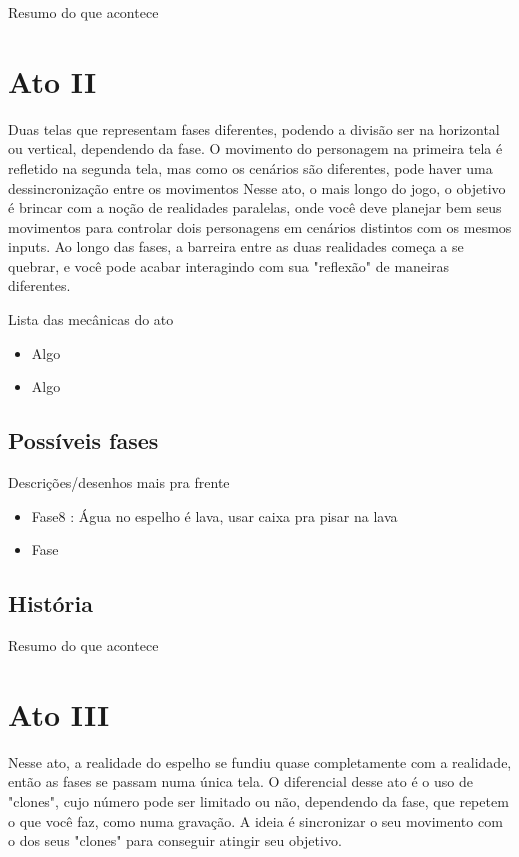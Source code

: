 \documentclass[a4paper, 11pt]{article}
\begin{document}
	Resumo do que acontece  
 
\section{Ato II} 
 
	Duas telas que representam fases diferentes, podendo a divisão ser na horizontal ou vertical, dependendo da fase. 
	O movimento do personagem na primeira tela é refletido na segunda tela, mas como os cenários são diferentes, pode 
	haver uma dessincronização entre os movimentos 
	Nesse ato, o mais longo do jogo, o objetivo é brincar com a noção de realidades paralelas, onde você deve planejar 
	bem seus movimentos para controlar dois personagens em cenários distintos com os mesmos inputs. Ao longo das fases, 
	a barreira entre as duas realidades começa a se quebrar, e você pode acabar interagindo com sua "reflexão" de  
	maneiras diferentes. 
 
	Lista das mecânicas do ato 
	\begin{itemize} 
		\item Algo 
		\item Algo 
	\end{itemize} 
 
\subsection{Possíveis fases} 
 
	Descrições/desenhos mais pra frente 
	\begin{itemize} 
		\item Fase8 : Água no espelho é lava, usar caixa pra pisar na lava 
		\item Fase 
	\end{itemize} 
 
\subsection{História} 
 
	Resumo do que acontece 
 
\section{Ato III} 
 
	Nesse ato, a realidade do espelho se fundiu quase completamente com a realidade, então as fases se passam numa única 
	tela. O diferencial desse ato é o uso de "clones", cujo número pode ser limitado ou não, dependendo da fase, que repetem o que você faz, como numa gravação. A ideia é sincronizar o seu movimento com o dos seus "clones" para conseguir atingir seu objetivo. 
 
\end{document}
